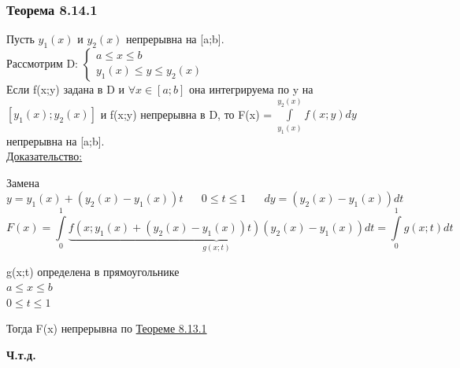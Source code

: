 \documentclass[12pt]{article}
\let\oldint\int
\renewcommand{\int}{\oldint\limits}
\begin{document}
  \subsubsection*{Теорема 8.14.1}\label{th:8.14.1}
  \par\noindent
  Пусть $y_1(x)$ и $y_2(x)$ непрерывна на [a;b].\\
  Рассмотрим D:
  $\begin{cases}
    a\leq x\leq b\\
    y_1(x)\leq y \leq y_2(x)
  \end{cases}$\\
  Если f(x;y) задана в D и $\forall x \in [a;b]$ она интегрируема по y на $[y_1(x);y_2(x)]$ и
  f(x;y) непрерывна в D, то F(x) = $\int_{y_1(x)}^{y_2(x)}f(x;y)dy$ непрерывна на [a;b].\\
  \underline{Доказательство:}
  \begin{adjustwidth}{1.5em}{1.5em}
    Замена $y=y_1(x)+(y_2(x)-y_1(x))t \hspace{20pt} 0\leq t\leq 1 \hspace{20pt} dy=(y_2(x)-y_1(x))dt$
    \[F(x)=\int_{0}^{1} \underbrace{f(x;y_1(x)+(y_2(x)-y_1(x))t)(y_2(x)-y_1(x))}_{g(x;t)}dt=
    \int_{0}^{1}g(x;t)dt\]
    \begin{center}
      g(x;t) определена в прямоугольнике\\
      $a\leq x\leq b$\\
      $0\leq t\leq1$
    \end{center} 
    Тогда F(x) непрерывна по \hyperref[th:8.13.1]{Теореме 8.13.1}
    \begin{center}
      \textbf{Ч.т.д.}
    \end{center}
  \end{adjustwidth}
\end{document}
